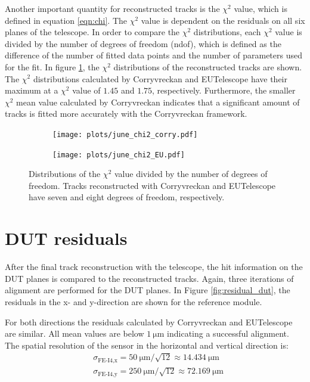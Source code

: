 Another important quantity for reconstructed tracks is the $\chi^2$ value, which is defined in equation \ref{eqn:chi}. The $\chi^2$ value is dependent on the
residuals on all six planes of the telescope. In order to compare the $\chi^2$ distributions, each $\chi^2$ value is divided by the number
of degrees of freedom (ndof), which is defined as the difference of the number of fitted data points and
the number of parameters used for the fit. In figure \ref{fig:ndof}, the $\chi^2$ distributions of the reconstructed tracks are shown. \\
The $\chi^2$ distributions calculated by Corryvreckan and EUTelescope have their maximum at
a $\chi^2$ value of $1.45$ and $1.75$, respectively. Furthermore, the smaller $\chi^2$ mean value calculated by
Corryvreckan indicates that a significant amount of tracks is fitted more accurately with the Corryvreckan framework.

\begin{figure}
  \hspace{-0.4cm}
  \begin{subfigure}{0.51\textwidth}
      \texttt{[image: plots/june\_chi2\_corry.pdf]}
  \end{subfigure}
  \begin{subfigure}{0.51\textwidth}
      \hspace{-0.19cm}
      \texttt{[image: plots/june\_chi2\_EU.pdf]}
  \end{subfigure}
  \caption{Distributions of the $\chi^2$ value divided by the number of degrees of freedom. Tracks reconstructed with Corryvreckan and EUTelescope
   have seven and eight degrees of freedom, respectively.}
  \label{fig:ndof}
\end{figure}



\section{DUT residuals}
After the final track reconstruction with the telescope, the hit information on the DUT planes is compared to the
reconstructed tracks. Again, three iterations of alignment are performed for the DUT planes. In Figure \ref{fig:residual_dut}, the residuals in the
x- and y-direction are shown for the reference module.

For both directions the residuals calculated by Corryvreckan and EUTelescope are similar. All mean values are below $\SI{1}{\micro\meter}$
indicating a successful alignment. The spatial resolution of the sensor in the horizontal and vertical direction is:
\begin{align*}
  &\sigma_{\text{FE-I4},\text{x}} = \SI{50}{\micro\meter}/\sqrt{12} \approx \SI{14.434}{\micro\meter} \\
  &\sigma_{\text{FE-I4},\text{y}} = \SI{250}{\micro\meter}/\sqrt{12} \approx \SI{72.169}{\micro\meter}
\end{align*}

